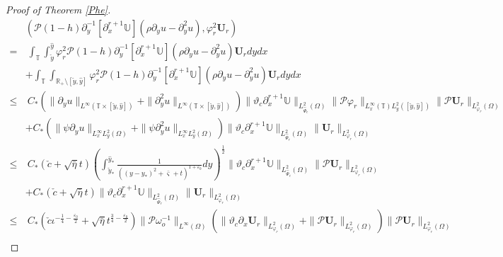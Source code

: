\documentclass[10pt,a4paper]{amsart}
\begin{document}
\begin{proof}[Proof of Theorem \ref{Phe}]
\begin{align}\label{JJ121}
&(\mathcal{P}(1-h)\partial_{y}^{-1}[\partial_{x}^{r+1}\mathbb{U}](\rho\partial_{y}u-\partial_{y}^{2}u),\varphi_{r}^{2}\mathbf{U}_{r})\\
=&~\int_{\mathbb{T}}\int_{\check{y}}^{\hat{y}}\varphi_{r}^{2}\mathcal{P}(1-h)\partial_{y}^{-1}[\partial_{x}^{r+1}\mathbb{U}](\rho\partial_{y}u-\partial_{y}^{2}u)\mathbf{U}_{r}dydx\nonumber\\
 &+\int_{\mathbb{T}}\int_{\mathbb{R}_{+}\setminus[\check{y},\hat{y}]}\varphi_{r}^{2}\mathcal{P}(1-h)\partial_{y}^{-1}[\partial_{x}^{r+1}\mathbb{U}](\rho\partial_{y}u-\partial_{y}^{2}u)\mathbf{U}_{r}dydx\nonumber\\
\leq&~C_{*}\left(\|\partial_{y}u\|_{L^{\infty}(\mathbb{T}\times[\check{y},\hat{y}])}
                 +\|\partial_{y}^{2}u\|_{L^{\infty}(\mathbb{T}\times[\check{y},\hat{y}])}\right)
          \|\vartheta_{c}\partial_{x}^{r+1}\mathbb{U}\|_{L_{\hat{\Psi}_{c}}^{2}(\Omega)}
          \|\mathcal{P}\varphi_{r}\|_{L_{x}^{\infty}(\mathbb{T})L_{y}^{2}([\check{y},\hat{y}])}
          \|\mathcal{P}\mathbf{U}_{r}\|_{L_{\varphi_{r}}^{2}(\Omega)}\nonumber\\
    &+C_{*}\left(\|\psi\partial_{y}u\|_{L_{x}^{\infty}L_{y}^{2}(\Omega)}+\|\psi\partial_{y}^{2}u\|_{L_{x}^{\infty}L_{y}^{2}(\Omega)}\right)
          \|\vartheta_{c}\partial_{x}^{r+1}\mathbb{U}\|_{L_{\hat{\Psi}_{r}}^{2}(\Omega)}\|\mathbf{U}_{r}\|_{L_{\varphi_{r}}^{2}(\Omega)}\nonumber\\
\leq&~C_{*}(\check{c}+\sqrt{\bar{\eta}}t)
          \left(\int_{\check{y}_{*}}^{\hat{y}_{*}}\frac{1}{((y-y_{*})^2+\bar{\varsigma}+t)^{1+\varepsilon_{0}}}dy\right)^{\frac{1}{2}}
          \|\vartheta_{c}\partial_{x}^{r+1}\mathbb{U}\|_{L_{\hat{\Psi}_{c}}^{2}(\Omega)}
          \|\mathcal{P}\mathbf{U}_{r}\|_{L_{\varphi_{r}}^{2}(\Omega)}\nonumber\\
    &+C_{*}(\check{c}+\sqrt{\bar{\eta}}t)\|\vartheta_{c}\partial_{x}^{r+1}\mathbb{U}\|_{L_{\hat{\Psi}_{r}}^{2}(\Omega)}
          \|\mathbf{U}_{r}\|_{L_{\varphi_{r}}^{2}(\Omega)}\nonumber\\
\leq&~C_{*}(\check{c}\iota^{-\frac{1}{4}-\frac{\varepsilon_{0}}{2}}+\sqrt{\bar{\eta}}t^{\frac{3}{4}-\frac{\varepsilon_{0}}{2}})
           \|\mathcal{P}\omega_{o}^{-1}\|_{L^{\infty}(\Omega)}
           \left(\|\vartheta_{c}\partial_{x}\mathbf{U}_{r}\|_{L_{\varphi_{r}}^{2}(\Omega)}
                 +\|\mathcal{P}\mathbf{U}_{r}\|_{L_{\varphi_{r}}^{2}(\Omega)}\right)
          \|\mathcal{P}\mathbf{U}_{r}\|_{L_{\varphi_{r}}^{2}(\Omega)}\nonumber\\

\end{align}
\end{proof}
\end{document}
